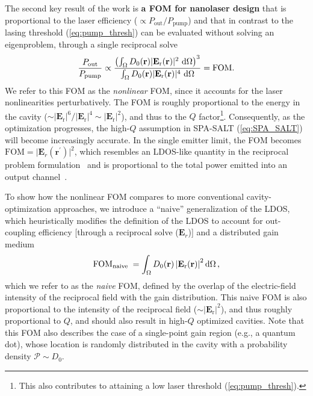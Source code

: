 The second key result of the work is \textbf{a FOM for nanolaser design} that is proportional to the laser efficiency ($\propto P_\text{out}/P_\text{pump}$) and that in contrast to the lasing threshold (\eqref{eq:pump_thresh}) can be evaluated without solving an eigenproblem, through a single reciprocal solve~\cite{ownpub4}
\begin{equation}\label{eq:eff_nl}
    \frac{P_\text{out}}{P_\text{pump}} \propto \frac{\left( \int_{\Omega} D_0(\mathbf{r})|\mathbf{E}_{\text{r}}(\mathbf{r})|^2 \,  \mathop{}\!\text{d} \Omega \right)^3} {\int_{\Omega} D_0(\mathbf{r}) |\mathbf{E}_{\text{r}}(\mathbf{r})|^4 \,  \mathop{}\!\text{d} \Omega} = \text{FOM}.
\end{equation}
We refer to this FOM as the \emph{nonlinear} FOM, since it accounts for the laser nonlinearities perturbatively. The FOM is roughly proportional 
to the energy in the cavity ($\sim |\mathbf{E}_{\text{r}}|^6 / |\mathbf{E}_{\text{r}}|^4 \sim |\mathbf{E}_{\text{r}}|^2$), and thus to the $Q$ factor\footnote{This also contributes to attaining a low
laser threshold (\eqref{eq:pump_thresh}).}. Consequently, as the optimization progresses, the high-$Q$ assumption in SPA-SALT (\eqref{eq:SPA_SALT}) will become increasingly accurate. In the single emitter limit, the FOM becomes
$\text{FOM}=\vert \mathbf{E}_{r}(\mathbf{r}^\prime) \vert^2$, which resembles an LDOS-like quantity in the reciprocal problem formulation~\cite{reci} and is proportional to the total power emitted into an output channel~\cite[App.~C]{reci}. 

To show how the nonlinear FOM compares to more conventional cavity-optimization approaches, we introduce a “naive” generalization of the LDOS, which heuristically modifies the definition
of the LDOS to account for out-coupling efficiency [through a reciprocal solve ($\mathbf{E}_r$)] and a distributed gain
medium
\begin{equation}\label{eq:SEL}
 \text{FOM}_{\text {naive }}=\int_{\Omega} D_0(\mathbf{r})\left|\mathbf{E}_{\text{r}}(\mathbf{r})\right|^2 \mathop{}\!\text{d} \Omega\,,
\end{equation}
which we refer to as the \emph{naive} FOM, defined by the overlap of the electric-field intensity of the reciprocal field with the gain distribution.
This naive FOM is also proportional to the intensity of the reciprocal field ($\sim |\mathbf{E}_{\text{r}}|^2$), and thus roughly proportional to $Q$, and should also result in 
high-$Q$ optimized cavities. Note that this FOM also describes the case of a single-point gain region (e.g., a quantum dot),
whose location is randomly distributed in the cavity with a probability density $\mathcal{P} \sim D_0$. 

